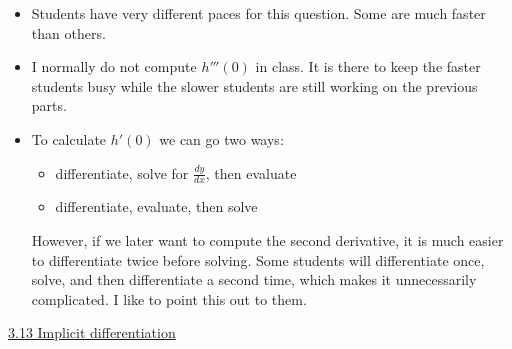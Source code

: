 \documentclass[11pt]{article}
\newcommand {\DS} [1] {${\displaystyle #1}$}
\newcommand{\nl}{\hfill \vspace{-1.1\baselineskip}} %
\newcommand{\vxiii}{\hspace{8mm} \href{https://www.youtube.com/watch?v=Ce44nuJzzdw&list=PLlwePzQY_wW8qiZD6XYqCnibdY37ygbx7&index=13}{3.13 Implicit differentiation}}
\begin{document}
\begin{comments}
\nl
	\begin{itemize}
		\item  Students have very different paces for this question.  Some are much faster than others. 
		\item I normally do not compute \DS{h'''(0)} in class.  It is there to keep the faster students busy while the slower students are still working on the previous parts.
		\item  To calculate $h'(0)$ we can go two ways:
			\begin{itemize}
				\item differentiate, solve for \DS{\frac{dy}{dx}}, then evaluate
				\item differentiate, evaluate, then solve
			\end{itemize}
			However, if we later want to compute the second derivative, it is much easier to differentiate twice before solving.   Some students will differentiate once, solve, and then differentiate a second time, which makes it unnecessarily complicated.  I like to point this out to them.
	\end{itemize}
\end{comments}

\begin{videos}
\vxiii
\end{videos}

\newpage
\end{document}
